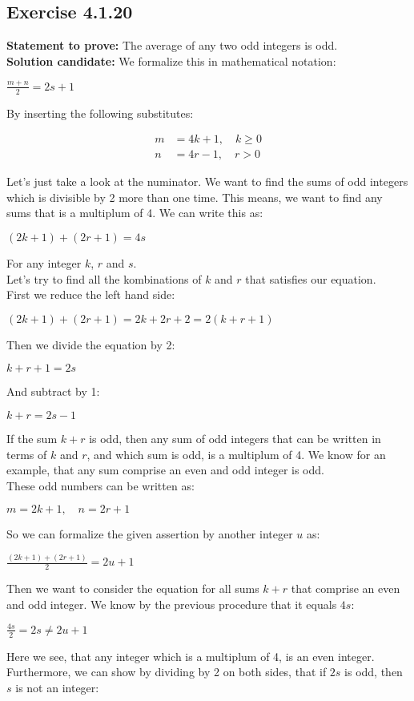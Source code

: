 \documentclass{report}
\newcommand{\cent}[1]{\begin{center}#1\end{center}}
\newcommand{\mAlign}[1]{\begin{align*}#1\end{align*}}
\newcommand{\Prove}{\textbf{Statement to prove: }}
\newcommand{\solution}{\textbf{Solution candidate: }}
\newcommand{\Exercise}[1]{\subsection{Exercise #1}}
\begin{document}
	\Exercise{4.1.20}
	\Prove
	The average of any two odd integers is odd.\\
	
	\solution
	We formalize this in mathematical notation:
	
	\cent{$\frac{m +n }{2} = 2s + 1$}
	
	By inserting the following substitutes:
	
	\mAlign{m &= 4k + 1, \quad  k \geq 0\\
				  n &= 4r -1, \quad r > 0}
	
	Let's just take a look at the numinator. We want to find the sums of odd integers which is divisible by 2 more than one time. This means, we want to find any sums that is a multiplum of 4. We can write this as:
	
	\cent{$(2k+1)+(2r+1)=4s$}
	
	For any integer $k$, $r$ and $s$.\\
	
	Let's try to find all the kombinations of $k$ and $r$ that satisfies our equation.\\
	
	First we reduce the left hand side:
	
	\cent{$(2k+1)+ (2r+1) = 2k + 2r + 2 = 2(k+r + 1 )$}
	
	Then we divide the equation by 2:
	
	\cent{$k+r+1=2s$}
	
	And subtract by 1:
	
	\cent{$k+r=2s-1$}
	
	If the sum $k+r$ is odd, then any sum of odd integers that can be written in terms of $k$ and $r$, and which sum is odd, is a multiplum of 4. We know for an example, that any sum comprise an even and odd integer is odd.\\
	
	These odd numbers can be written as:
		
	\cent{$m = 2k+1, \quad n = 2r+1 $}
	
	So we can formalize the given assertion by another integer $u$ as:
	
	\cent{$\frac{(2k+1) + (2r+1)}{2} = 2u +1$}
	
	Then we want to consider the equation for all sums $k+r$ that comprise an even and odd integer. We know by the previous procedure that it equals $4s$:
	
	\cent{$\frac{4s}{2} = 2s \neq 2u +1$}
	
	Here we see, that any integer which is a multiplum of 4, is an even integer. Furthermore, we can show by dividing by 2 on both sides, that if $2s$ is odd, then $s$ is not an integer:
	
\end{document}
